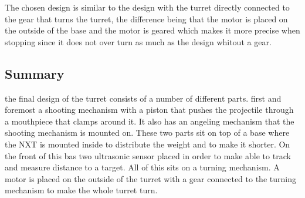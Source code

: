 The chosen design is similar to the design with the turret directly connected to
the gear that turns the turret, the difference being that the motor is placed on
the outside of the base and the motor is geared which makes it more precise when
stopping since it does not over turn as much as the design whitout a gear. 

\subsection{Summary}
the final design of the turret consists of a number of different parts. first
and foremost a shooting mechanism with a piston that pushes the projectile
through a mouthpiece that clamps around it. It also has an angeling mechanism
that the shooting mechanism is mounted on. These two parts sit on top of a
base where the NXT is mounted inside to distribute the weight and to make it
shorter. On the front of this bas two ultrasonic sensor placed in order to make
\name able to track and measure distance to a target. All of this sits on a
turning mechanism. A motor is placed on the outside of the
turret with a gear connected to the turning mechanism to make the whole turret
turn. 
